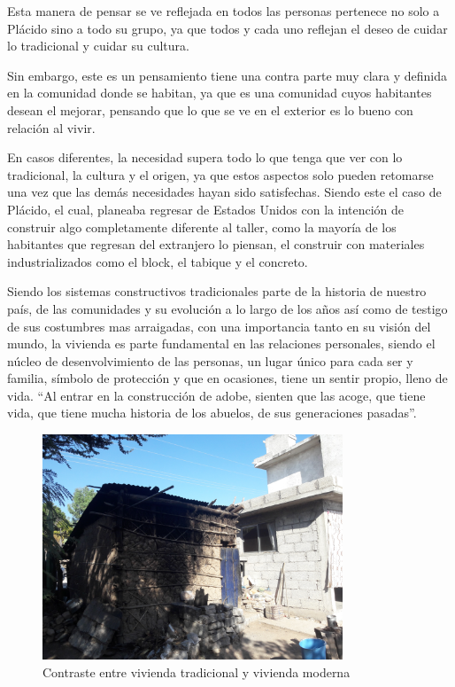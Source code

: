 Esta manera de pensar se ve reflejada en todos las personas pertenece no solo a Plácido sino a todo su grupo, ya que todos y cada uno reflejan el deseo de cuidar lo tradicional y cuidar su cultura.

Sin embargo, este es un pensamiento tiene una contra parte muy clara y definida en la comunidad donde se habitan, ya que es una comunidad cuyos habitantes desean el mejorar, pensando que lo que se ve en el exterior es lo bueno con relación al vivir.

En casos diferentes, la necesidad supera todo lo que tenga que ver con lo tradicional, la cultura y el origen, ya que estos aspectos solo pueden retomarse una vez que las demás necesidades hayan sido satisfechas. Siendo este el caso de Plácido, el cual, planeaba regresar de Estados Unidos con la intención de construir algo completamente diferente al taller, como la mayoría de los habitantes que regresan del extranjero lo piensan, el construir con materiales industrializados como el block, el tabique y el concreto.

Siendo los sistemas constructivos tradicionales parte de la historia de nuestro país, de las comunidades y su evolución a lo largo de los años así como de testigo de sus costumbres mas arraigadas, con una importancia tanto en su visión del mundo, la vivienda es parte fundamental en las relaciones personales, siendo el núcleo de desenvolvimiento de las personas, un lugar único para cada ser y familia, símbolo de protección y que en ocasiones, tiene un sentir propio, lleno de vida. ``Al entrar en la construcción de adobe, sienten que las acoge, que tiene vida, que tiene mucha historia de los abuelos, de sus generaciones pasadas''\citep{jeronimas}.

\begin{figure}[ht]
    \center
    \includegraphics[width=0.8\textwidth]{../../imagenes/Contraste.jpg}
    \caption{Contraste entre vivienda tradicional y vivienda moderna}
\end{figure}

